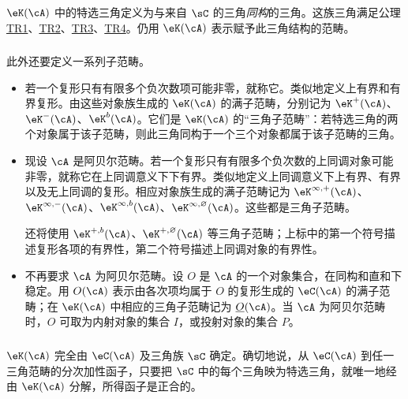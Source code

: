 $\eK(\cA)$ 中的特选三角定义为与来自 $\sC$ 的三角\emph{同构}的三角。这族三角满足公理 \hyperlink{VIII:TR1}{TR1}、\hyperlink{VIII:TR2}{TR2}、\hyperlink{VIII:TR3}{TR3}、\hyperlink{VIII:TR4}{TR4}。仍用 $\eK(\cA)$ 表示赋予此三角结构的范畴。
\subsubsection{}\label{VIII:1-2-3}
此外还要定义一系列子范畴。
\begin{itemize}
\item 若一个复形只有有限多个负次数项可能非零，就称它。类似地定义上有界和有界复形。由这些对象族生成的 $\eK(\cA)$ 的满子范畴，分别记为 $\eK^+(\cA)$、$\eK^-(\cA)$、$\eK^b(\cA)$。它们是 $\eK(\cA)$ 的“三角子范畴”：若特选三角的两个对象属于该子范畴，则此三角同构于一个三个对象都属于该子范畴的三角。
\item 现设 $\cA$ 是阿贝尔范畴。若一个复形只有有限多个负次数的上同调对象可能非零，就称它在上同调意义下下有界。类似地定义上同调意义下上有界、有界以及无上同调的复形。相应对象族生成的满子范畴记为 $\eK^{\infty,+}(\cA)$、$\eK^{\infty,-}(\cA)$、$\eK^{\infty,b}(\cA)$、$\eK^{\infty,\varnothing}(\cA)$。这些都是三角子范畴。

还将使用 $\eK^{+,b}(\cA)$、$\eK^{+,\varnothing}(\cA)$ 等三角子范畴；上标中的第一个符号描述复形各项的有界性，第二个符号描述上同调对象的有界性。
\item 不再要求 $\cA$ 为阿贝尔范畴。设 $O$ 是 $\cA$ 的一个对象集合，在同构和直和下稳定。用 $O(\cA)$ 表示由各次项均属于 $O$ 的复形生成的 $\eC(\cA)$ 的满子范畴；在 $\eK(\cA)$ 中相应的三角子范畴记为 $\underline O(\cA)$。当 $\cA$ 为阿贝尔范畴时，$O$ 可取为内射对象的集合 $I$，或投射对象的集合 $P$。
\end{itemize}
\subsubsection{}\label{VIII:1-2-4}
$\eK(\cA)$ 完全由 $\eC(\cA)$ 及三角族 $\sC$ 确定。确切地说，从 $\eC(\cA)$ 到任一三角范畴的分次加性函子，只要把 $\sC$ 中的每个三角映为特选三角，就唯一地经由 $\eK(\cA)$ 分解，所得函子是正合的。

